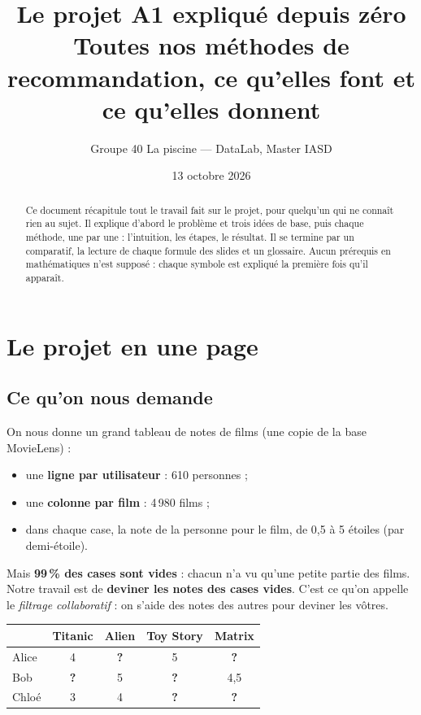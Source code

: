 \documentclass[11pt,a4paper]{article}
\title{\textbf{Le projet A1 expliqué depuis zéro}\\[6pt]
  \large Toutes nos méthodes de recommandation, ce qu'elles font et ce qu'elles donnent}
\author{Groupe 40 \og La piscine \fg{} --- DataLab, Master IASD}
\date{13 octobre 2026}
\begin{document}
\maketitle

\begin{abstract}
\noindent Ce document récapitule tout le travail fait sur le projet, pour quelqu'un
qui ne connaît rien au sujet. Il explique d'abord le problème et trois idées de base,
puis chaque méthode, une par une : l'intuition, les étapes, le résultat. Il se termine
par un comparatif, la lecture de chaque formule des slides et un glossaire.
Aucun prérequis en mathématiques n'est supposé : chaque symbole est expliqué
la première fois qu'il apparaît.
\end{abstract}

\setcounter{tocdepth}{1}
\tableofcontents
\newpage

\section{Le projet en une page}

\subsection{Ce qu'on nous demande}

On nous donne un grand tableau de notes de films (une copie de la base MovieLens) :
\begin{itemize}
  \item une \textbf{ligne par utilisateur} : 610 personnes ;
  \item une \textbf{colonne par film} : 4\,980 films ;
  \item dans chaque case, la note de la personne pour le film, de 0,5 à 5 étoiles
        (par demi-étoile).
\end{itemize}
Mais \textbf{99\,\% des cases sont vides} : chacun n'a vu qu'une petite partie des films.
Notre travail est de \textbf{deviner les notes des cases vides}. C'est ce qu'on appelle
le \emph{filtrage collaboratif} : on s'aide des notes des autres pour deviner les vôtres.

\begin{center}
\begin{tabular}{lcccc}
\toprule
      & Titanic & Alien & Toy Story & Matrix \\
\midrule
Alice & 4 & \textbf{?} & 5 & \textbf{?} \\
Bob   & \textbf{?} & 5 & \textbf{?} & 4,5 \\
Chloé & 3 & 4 & \textbf{?} & \textbf{?} \\
\bottomrule
\end{tabular}
\end{center}
\end{document}
